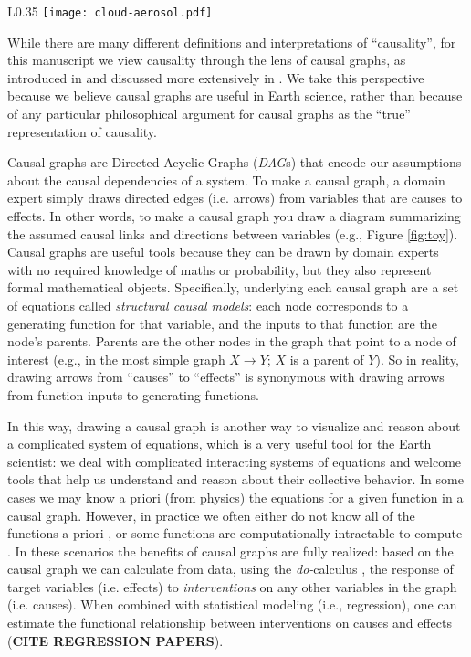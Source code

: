 \documentclass[12pt]{article}
\begin{document}
\begin{wrapfigure}{L}{0.35\textwidth}
  \texttt{[image: cloud-aerosol.pdf]}
  \caption{A toy graph example to demonstrate basic causal theory,
    involving cloud (C), aerosol (A), and surface solar radiation
    (S).}
  \label{fig:toy}
\end{wrapfigure}

While there are many different definitions and interpretations of
``causality'', for this manuscript we view causality through the lens
of causal graphs, as introduced in \citet{pearl1995causal} and
discussed more extensively in \citet{pearl2009causality}. We take this
perspective because we believe causal graphs are useful in Earth
science, rather than because of any particular philosophical argument
for causal graphs as the ``true'' representation of causality.

Causal graphs are Directed Acyclic Graphs (\emph{DAG}s) that encode
our assumptions about the causal dependencies of a system. To make a
causal graph, a domain expert simply draws directed edges
(i.e. arrows) from variables that are causes to effects. In other
words, to make a causal graph you draw a diagram summarizing the
assumed causal links and directions between variables (e.g., Figure
\ref{fig:toy}). Causal graphs are useful tools because they can be
drawn by domain experts with no required knowledge of maths or
probability, but they also represent formal mathematical
objects. Specifically, underlying each causal graph are a set of
equations called \emph{structural causal models}: each node
corresponds to a generating function for that variable, and the inputs
to that function are the node's parents. Parents are the other nodes
in the graph that point to a node of interest (e.g., in the most
simple graph $X \to Y$; $X$ is a parent of $Y$). So in reality,
drawing arrows from ``causes'' to ``effects'' is synonymous with
drawing arrows from function inputs to generating functions.

In this way, drawing a causal graph is another way to visualize and
reason about a complicated system of equations, which is a very useful
tool for the Earth scientist: we deal with complicated interacting
systems of equations and welcome tools that help us understand and
reason about their collective behavior. In some cases we may know a
priori (from physics) the equations for a given function in a causal
graph. However, in practice we often either do not know all of the
functions a priori \citep[e.g., plant stomata response to
VPD;][]{massmann2019, zhou2019arid, zhou2019feedback, grossiord2020},
or some functions are computationally intractable to compute
\citep[e.g., turbulence, moist convection, and cloud microphysics in
large scale models;][]{zadra2018,gentine2018}. In these scenarios the
benefits of causal graphs are fully realized: based on the causal
graph we can calculate from data, using the \textit{do-}calculus
\citep{pearl-1994-do-calculus}, the response of target variables
(i.e. effects) to \textit{interventions} on any other variables in the
graph (i.e. causes). When combined with statistical modeling (i.e.,
regression), one can estimate the functional relationship between
interventions on causes and effects (\textbf{CITE REGRESSION PAPERS}).
\end{document}
